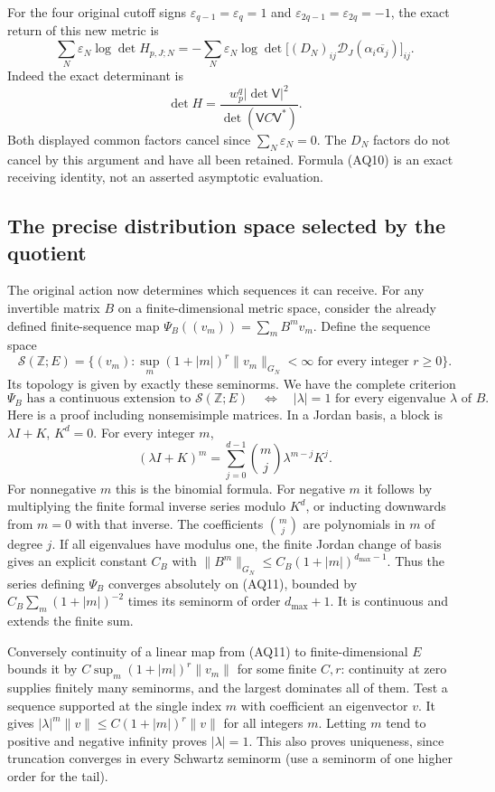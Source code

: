 For the four original cutoff signs
$\varepsilon_{q-1}=\varepsilon_q=1$ and
$\varepsilon_{2q-1}=\varepsilon_{2q}=-1$, the exact return of this
new metric is
\[
 \sum_N\varepsilon_N\log\det H_{p,J;N}
  =-\sum_N\varepsilon_N\log\det
   \big[(D_N)_{ij}\mathcal D_J(\alpha_i\overline{\alpha_j})\big]_{ij}.
 \tag{AQ10}
\]
Indeed the exact determinant is
\[
 \det H=\frac{w_p^q|\det\mathsf V|^2}{\det(\mathsf V C\mathsf V^*)}.
\]
Both displayed common factors cancel since $\sum_N\varepsilon_N=0$.
The $D_N$ factors do not
cancel by this argument and have all been retained. Formula (AQ10)
is an exact receiving identity, not an asserted asymptotic evaluation.

\subsection{The precise distribution space selected by the quotient}
The original action now determines which sequences it can receive.
For any invertible matrix $B$ on a finite-dimensional metric space,
consider the already defined finite-sequence map
$\Psi_B((v_m))=\sum_m B^mv_m$. Define the sequence space
\[
 \mathscr S(\mathbb Z;E)=
 \{(v_m):\sup_m(1+|m|)^r\|v_m\|_{G_N}<\infty
                   \text{ for every integer }r\ge0\}.
 \tag{AQ11}
\]
Its topology is given by exactly these seminorms. We have the complete
criterion
\[
 \Psi_B\text{ has a continuous extension to }\mathscr S(\mathbb Z;E)
 \quad\Longleftrightarrow\quad
 |\lambda|=1\text{ for every eigenvalue }\lambda\text{ of }B.
 \tag{AQ12}
\]
Here is a proof including nonsemisimple matrices. In a Jordan basis,
a block is $\lambda I+K$, $K^d=0$. For every integer $m$,
\[
 (\lambda I+K)^m
 =\sum_{j=0}^{d-1}\binom mj\lambda^{m-j}K^j.
 \tag{AQ13}
\]
For nonnegative $m$ this is the binomial formula. For negative $m$ it
follows by multiplying the finite formal inverse series modulo $K^d$,
or inducting downwards from $m=0$ with that inverse. The coefficients
$\binom mj$ are polynomials in $m$ of degree $j$. If all eigenvalues
have modulus one, the finite Jordan change of basis gives an explicit
constant $C_B$ with $\|B^m\|_{G_N}\le C_B(1+|m|)^{d_{\max}-1}$.
Thus the series defining $\Psi_B$ converges absolutely on (AQ11),
bounded by $C_B\sum_m(1+|m|)^{-2}$ times its seminorm of order
$d_{\max}+1$. It is continuous and extends the finite sum.

Conversely continuity of a linear map from (AQ11) to finite-dimensional
$E$ bounds it by $C\sup_m(1+|m|)^r\|v_m\|$ for some finite $C,r$:
continuity at zero supplies finitely many seminorms, and the largest
dominates all of them. Test a sequence supported at the single index
$m$ with coefficient an eigenvector $v$. It gives
$|\lambda|^m\|v\|\le C(1+|m|)^r\|v\|$ for all integers $m$.
Letting $m$ tend to positive and negative infinity proves $|\lambda|=1$.
This also proves uniqueness, since truncation converges in every
Schwartz seminorm (use a seminorm of one higher order for the tail).


